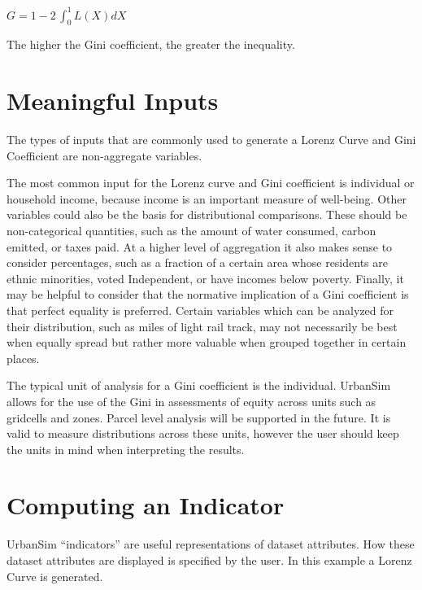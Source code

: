 \documentclass{howto}
\begin{document}
    $G = 1 - 2\,\int_0^1 L(X) dX$ 

The higher the Gini coefficient, the greater the inequality.


\section*{Meaningful Inputs}

The types of inputs that are commonly used to generate a Lorenz Curve and 
Gini Coefficient are non-aggregate variables. 

The most common input for the Lorenz curve and Gini coefficient is individual or household
income, because income is an important measure of well-being.  Other variables
could also be the basis for distributional comparisons.  These should be
non-categorical quantities, such as the amount of water consumed, carbon emitted, or 
taxes paid.  At a higher level of aggregation it also makes sense to consider
percentages, such as a fraction of a certain area whose residents are ethnic
minorities, voted Independent, or have incomes below poverty.  Finally, it may be
helpful to consider that the normative implication of a Gini coefficient is that perfect 
equality is preferred.  Certain variables which can be analyzed for their distribution, such as miles of light rail track,
may not necessarily be best when equally spread but rather more valuable when
grouped together in certain places.

The typical unit of analysis for a Gini coefficient is the individual.  UrbanSim allows for the use of the Gini
in assessments of equity across units such as gridcells and zones.  Parcel level
analysis will be supported in the future.  It is valid to measure distributions across 
these units, however the user should keep the units in mind when interpreting the results.

\section*{Computing an Indicator}

UrbanSim ``indicators'' are useful representations of dataset attributes.  
How these dataset attributes are displayed is specified by the user.  
In this example a Lorenz Curve is generated.
\end{document}
